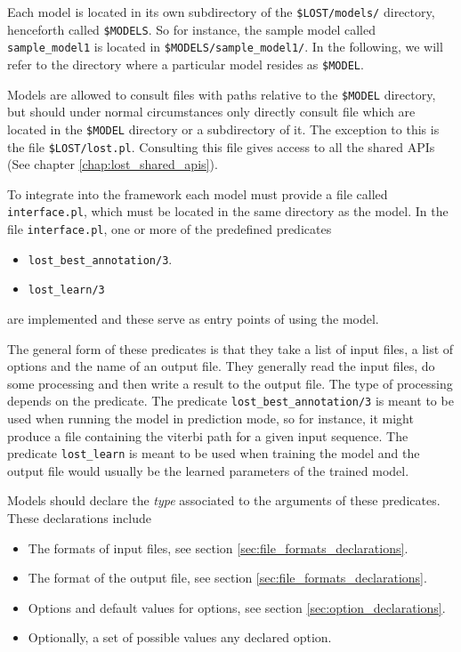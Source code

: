 \documentclass{book}
\begin{document}
Each model is located in its own subdirectory of the 
\texttt{\$LOST/models/} directory, henceforth called \texttt{\$MODELS}. 
So for instance, the sample model called \texttt{sample\_model1} is located in
\texttt{\$MODELS/sample\_model1/}. In the following, we will refer to the directory 
where a particular model resides as \texttt{\$MODEL}.

Models are allowed to consult files with paths relative to the
\texttt{\$MODEL} directory, but should under normal circumstances
only directly consult file which are located in the 
\texttt{\$MODEL} directory or a subdirectory of it.
The exception to this is the file \texttt{\$LOST/lost.pl}. Consulting
this file gives access to all the shared APIs (See chapter \ref{chap:lost_shared_apis}).

To integrate into the framework each model must provide a file called
\texttt{interface.pl}, which must be located in the same directory as
the model. In the file \texttt{interface.pl}, one or more of the predefined
predicates
\begin{itemize}
\item \texttt{lost\_best\_annotation/3}.
\item \texttt{lost\_learn/3}
\end{itemize}
\noindent
are implemented and these serve as entry points of using the model. 

The general form of these predicates is that they take a list of
input files, a list of options and the name of an output file. They 
generally read the input files, do some processing and then write
a result to the output file. The type of processing depends on the
predicate. The predicate \texttt{lost\_best\_annotation/3} is meant to
be used when running the model in prediction mode, so for instance, it 
might produce a file containing the viterbi path for a given input
sequence. The predicate \texttt{lost\_learn} is meant to be used when 
training the model and the output file would usually be the learned
parameters of the trained model.

Models should declare the \emph{type} associated to the arguments of
these predicates. These declarations include
\begin{itemize}
\item The formats of input files, see section
  \ref{sec:file_formats_declarations}.
\item The format of the output file, see section
  \ref{sec:file_formats_declarations}.
\item Options and default values for options, see section
  \ref{sec:option_declarations}.
\item Optionally, a set of possible values any declared option.
\end{itemize}
\end{document}
